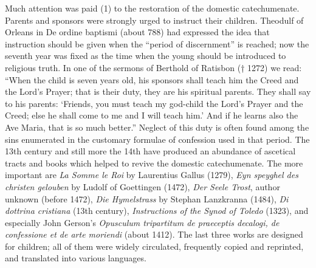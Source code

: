 Much attention was paid (1) to the restoration of the domestic catechumenate. Parents and sponsors were strongly urged to instruct their children. Theodulf of Orleans in De ordine baptismi (about 788) had expressed the idea that instruction should be given when the “period of discernment” is reached; now the seventh year was fixed as the time when
the young should be introduced to religious truth. In one of the sermons of Berthold of Ratisbon († 1272) we read: “When the child is seven years old, his sponsors shall teach him the Creed and the Lord’s Prayer; that is their duty, they are his spiritual parents. They shall say to his parents: ‘Friends, you must teach my god-child the Lord’s Prayer and the Creed; else he shall come to me and I will teach him.’ And if he learns also the Ave Maria, that is so much better.” Neglect of this duty is often found among the sins enumerated in the customary formulae of confession used in that period. The 13th century and still more the 14th have produced an abundance of ascetical tracts and books which helped to revive the domestic catechumenate. The more important are \emph{La Somme le Roi} by Laurentius Gallus (1279), \emph{Eyn speyghel des christen gelouben} by Ludolf of Goettingen (1472), \emph{Der Seele Trost}, author unknown (before 1472), \emph{Die Hymelstrass} by Stephan Lanzkranna (1484), \emph{Di dottrina cristiana} (13th century), \emph{Instructions of the Synod of Toledo} (1323), and especially John Gerson’s \emph{Opusculum tripartitum de praeceptis decalogi, de confessione et de arte moriendi} (about 1412). The last three works are designed for children; all of them were widely circulated, frequently copied and reprinted, and translated into various languages.

